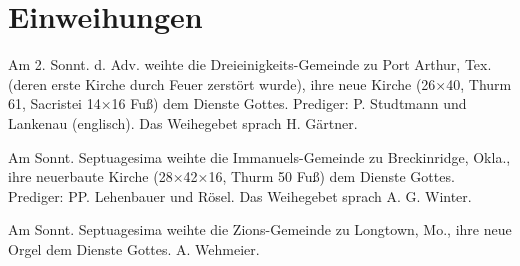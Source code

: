 \chapter{Einweihungen}

Am 2. Sonnt. d. Adv. weihte die Dreieinigkeits-Gemeinde zu Port Arthur, Tex. (deren erste Kirche durch Feuer zerstört wurde), ihre neue Kirche (26×40, Thurm 61, Sacristei 14×16 Fuß) dem Dienste Gottes. Prediger: P. Studtmann und Lankenau (englisch). Das Weihegebet sprach H. Gärtner.

Am Sonnt. Septuagesima weihte die Immanuels-Gemeinde zu Breckinridge, Okla., ihre neuerbaute Kirche (28×42×16, Thurm 50 Fuß) dem Dienste Gottes. Prediger: PP. Lehenbauer und Rösel. Das Weihegebet sprach A. G. Winter.

Am Sonnt. Septuagesima weihte die Zions-Gemeinde zu Longtown, Mo., ihre neue Orgel dem Dienste Gottes. A. Wehmeier.
